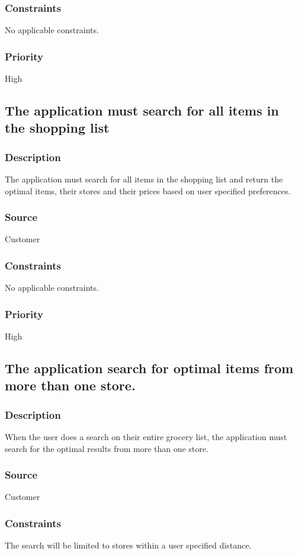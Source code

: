 \subsubsection{Constraints}
No applicable constraints.
\subsubsection{Priority}
High\\
\subsection{The application must search for all items in the shopping list}
\subsubsection{Description}
The application must search for all items in the shopping list and return the optimal items, their stores and their prices based on user specified preferences.
\subsubsection{Source}
Customer
\subsubsection{Constraints}
No applicable constraints.
\subsubsection{Priority}
High\\

\subsection{The application search for optimal items from more than one store.}
\subsubsection{Description}
When the user does a search on their entire grocery list, the application must search for the optimal results from more than one store.
\subsubsection{Source}
Customer
\subsubsection{Constraints}
The search will be limited to stores within a user specified distance.
